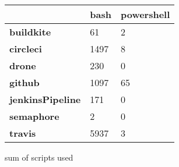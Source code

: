 
\begin{tabular}{|l|l|l|}
\hline
{} &  bash &  powershell \\ \hline

\textbf{buildkite      } &    61 &           2 \\ \hline
\textbf{circleci       } &  1497 &           8 \\ \hline
\textbf{drone          } &   230 &           0 \\ \hline
\textbf{github         } &  1097 &          65 \\ \hline
\textbf{jenkinsPipeline} &   171 &           0 \\ \hline
\textbf{semaphore      } &     2 &           0 \\ \hline
\textbf{travis         } &  5937 &           3 \\ \hline

\end{tabular}
\caption{sum of scripts used}
\label{table:scripts used}
